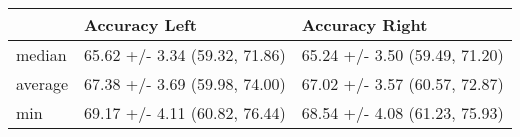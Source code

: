 \begin{tabular}{lll}
\toprule
{} &                  Accuracy Left &                 Accuracy Right \\
\midrule
median  &  65.62 +/- 3.34 (59.32, 71.86) &  65.24 +/- 3.50 (59.49, 71.20) \\
average &  67.38 +/- 3.69 (59.98, 74.00) &  67.02 +/- 3.57 (60.57, 72.87) \\
min     &  69.17 +/- 4.11 (60.82, 76.44) &  68.54 +/- 4.08 (61.23, 75.93) \\
\bottomrule
\end{tabular}
